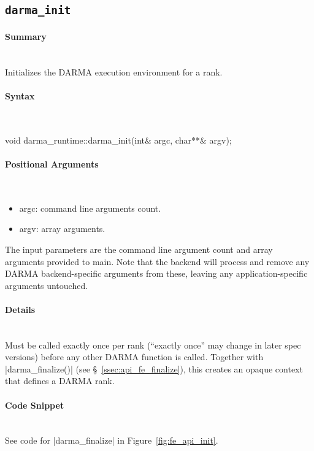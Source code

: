 
\subsection{\texttt{darma\_init}}

\paragraph{Summary}\mbox{}\\
Initializes the DARMA execution environment for a rank.

\paragraph{Syntax}\mbox{}\\
\begin{CppCode}
void darma_runtime::darma_init(int& argc, char**& argv);
\end{CppCode}

\paragraph{Positional Arguments}\mbox{}\\
\begin{itemize}
\item argc: command line arguments count.
\item argv: array arguments.
\end{itemize}
The input parameters are the command line argument count 
and array arguments provided to main.  
Note that the backend will process and remove 
any DARMA backend-specific arguments from these, leaving any
application-specific arguments untouched.


\paragraph{Details}\mbox{}\\
Must be called exactly once per rank (``exactly once'' may change in later
spec versions) before any other DARMA function is called.
Together with |darma_finalize()| (see \S~\ref{ssec:api_fe_finalize}),
this creates an opaque context that defines a DARMA rank.

\paragraph{Code Snippet}\mbox{}\\ 
See code for |darma_finalize| in Figure~\ref{fig:fe_api_init}.

